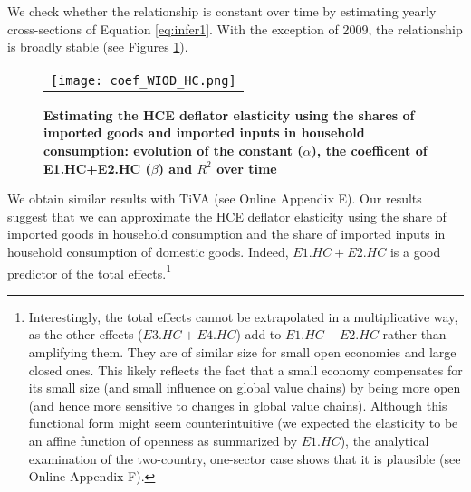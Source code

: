 \documentclass[11pt,a4paper]{paper} %
\begin{document}
We check whether the relationship is constant over time by estimating yearly cross-sections of Equation \ref{eq:infer1}. 
With the exception of 2009, the relationship is broadly stable (see Figures \ref{fig:evolution_coef}).

\begin{figure}[H]
\centering
\caption{\footnotesize{\textbf{Estimating the HCE deflator elasticity using the shares of imported goods and imported inputs in household consumption: evolution of the constant ($\alpha$), the coefficent of E1.HC+E2.HC ($\beta$) and $R^2$ over time}}}
\begin{tabular}{c}
\texttt{[image: coef\_WIOD\_HC.png]}\\
\end{tabular}
\label{fig:evolution_coef}
\end{figure}

We obtain similar results with TiVA (see Online Appendix E). 
Our results suggest that we can approximate the HCE deflator elasticity using the share of imported goods in household consumption and the share of imported inputs in household consumption of domestic goods. Indeed, $E1.HC+E2.HC$ is a good predictor of the total effects.\footnote{Interestingly, the total effects cannot be extrapolated in a multiplicative way, as the other effects ($E3.HC+E4.HC$) add to $E1.HC+E2.HC$ rather than amplifying them.
They are of similar size for small open economies and large closed ones.
This likely reflects the fact that a small economy compensates for its small size (and small influence on global value chains) by being more open (and hence more sensitive to changes in global value chains). Although this functional form might seem counterintuitive (we expected the elasticity to be an affine function of openness as summarized by $E1.HC$), the analytical examination of the two-country, one-sector case shows that it is plausible (see Online Appendix F).}
\end{document}
